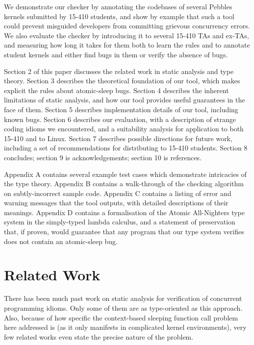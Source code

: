 \documentclass{article}
\begin{document}
We demonstrate our checker by annotating the codebases of several Pebbles kernels submitted by 15-410 students, and show by example that such a tool could prevent misguided developers from committing grievous concurrency errors.
We also evaluate the checker by introducing it to several 15-410 TAs and ex-TAs, and measuring how long it takes for them both to learn the rules and to annotate student kernels and either find bugs in them or verify the absence of bugs.


Section 2 of this paper discusses the related work in static analysis and type theory.
Section 3 describes the theoretical foundation of our tool, which makes explicit the rules about atomic-sleep bugs.
Section 4 describes the inherent limitations of static analysis, and how our tool provides useful guarantees in the face of them.
Section 5 describes implementation details of our tool, including known bugs.
Section 6 describes our evaluation, with a description of strange coding idioms we encountered, and a suitability analysis for application to both 15-410 and to Linux.
Section 7 describes possible directions for future work, including a set of recommendations for distributing to 15-410 students.
Section 8 concludes; section 9 is acknowledgements; section 10 is references.

Appendix A contains several example test cases which demonstrate intricacies of the type theory.
Appendix B contains a walk-through of the checking algorithm on subtly-incorrect sample code.
Appendix C contains a listing of error and warning messages that the tool outputs, with detailed descriptions of their meanings.
Appendix D contains a formalisation of the Atomic All-Nighters type system in the simply-typed lambda calculus, and a statement of preservation that, if proven, would guarantee that any program that our type system verifies does not contain an atomic-sleep bug.


\section{Related Work}

There has been much past work on static analysis for verification of concurrent programming idioms. Only some of them are as type-oriented as this approach. Also, because of how specific the context-based sleeping function call problem here addressed is (as it only manifests in complicated kernel environments), very few related works even state the precise nature of the problem.
\end{document}
